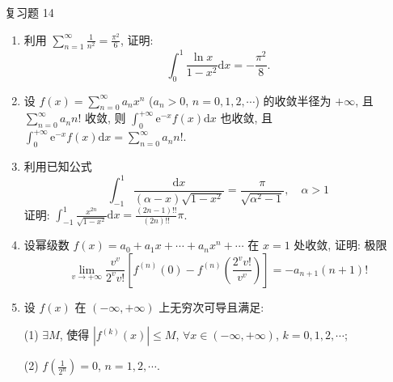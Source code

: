 \begin{exblock}{复习题 14}
\begin{enumerate}
  (2) 求极限 $\displaystyle\lim_{x\to0}\sum_{n=1}^{\infty}\frac{(-1)^{n}}{x^{2}+\frac{2^{n}}{n(n+1)}}$.
  \item 利用 $\sum_{n=1}^{\infty}\frac{1}{n^{2}}=\frac{\pi^{2}}{6}$, 证明:
  \[
    \int_{0}^{1}\frac{\ln x}{1-x^{2}}\mathrm{d}x=-\frac{\pi^{2}}{8}.
\]
  \item 设 $f(x)=\sum_{n=0}^{\infty}a_{n}x^{n}$ ($a_{n}>0$, $n=0,1,2,\cdots$) 的收敛半径为 $+\infty$, 且 $\sum_{n=0}^{\infty}a_{n}n!$ 收敛, 则 $\displaystyle\int_{0}^{+\infty}\mathrm{e}^{-x}f(x)\mathrm{d}x$ 也收敛, 且 $\displaystyle\int_{0}^{+\infty}\mathrm{e}^{-x}f(x)\mathrm{d}x=\sum_{n=0}^{\infty}a_{n}n!$.
  \item 利用已知公式
  \[
    \int_{-1}^{1}\frac{\mathrm{d}x}{(\alpha-x)\sqrt{1-x^{2}}}=\frac{\pi}{\sqrt{\alpha^{2}-1}},\quad\alpha>1
\]
  证明: $\displaystyle\int_{-1}^{1}\frac{x^{2n}}{\sqrt{1-x^{2}}}\mathrm{d}x=\frac{(2n-1)!!}{(2n)!!}\pi$.
  \item 设幂级数 $f(x)=a_{0}+a_{1}x+\cdots+a_{n}x^{n}+\cdots$ 在 $x=1$ 处收敛, 证明: 极限
  \[
    \lim_{v\to+\infty}\frac{v^{v}}{2^{v}v!}\left[f^{(n)}(0)-f^{(n)}\left(\frac{2^{v}v!}{v^{v}}\right)\right]=-a_{n+1}(n+1)!
\]
  \item 设 $f(x)$ 在 $(-\infty,+\infty)$ 上无穷次可导且满足:

  (1) $\exists M$, 使得 $|f^{(k)}(x)|\leqslant M$, $\forall x\in(-\infty,+\infty)$, $k=0,1,2,\cdots$;

  (2) $f\left(\frac{1}{2^{n}}\right)=0$, $n=1,2,\cdots$.


\end{enumerate}
\end{exblock}

